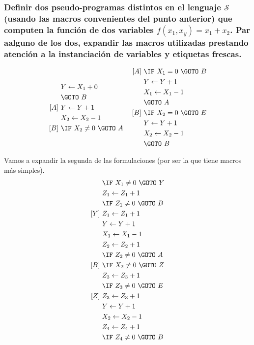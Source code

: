 \documentclass[fleqn, 11pt]{article}
\newcommand{\Scur}{\mathcal{S}}
\newcommand{\into}{\leftarrow}
\begin{document}
\subsubsection{Definir dos pseudo-programas distintos en el lenguaje $\Scur$
(usando las macros convenientes del punto anterior) que computen la función de
dos variables $f(x_1, x_y) = x_1 + x_2$. Par aalguno de los dos, expandir las
macros utilizadas prestando atención a la instanciación de variables y
etiquetas frescas.}

\begin{align*}
	\begin{aligned}
		     &Y   \into X_1 + 0 \\
		     &\GOTO\ B \\
		[A]\ &Y   \into Y   + 1 \\
		     &X_2 \into X_2 - 1 \\
		[B]\ &\IF\ X_2 \neq 0\ \GOTO\ A
	\end{aligned}
	&&
	\begin{aligned}\
		[A]\ &\IF\ X_1 = 0\ \GOTO\ B \\
		     &Y   \into Y   + 1 \\
		     &X_1 \into X_1 - 1 \\
		     &\GOTO\ A \\
		[B]\ &\IF\ X_2 = 0\ \GOTO\ E \\
		     &Y   \into Y   + 1 \\
		     &X_2 \into X_2 - 1 \\
		     &\GOTO\ B
	\end{aligned}
\end{align*}

Vamos a expandir la segunda de las formulaciones (por ser la que tiene macros
más simples).
\begin{align*}
	[A]\ &\IF\ X_1 \neq 0\ \GOTO\ Y \\
	     &Z_1 \into Z_1 + 1 \\
	     &\IF\ Z_1 \neq 0\ \GOTO\ B \\
	[Y]\ &Z_1 \into Z_1 + 1 \\
	     &Y   \into Y   + 1 \\
	     &X_1 \into X_1 - 1 \\
	     &Z_2 \into Z_2 + 1 \\
	     &\IF\ Z_2 \neq 0\ \GOTO\ A \\
	[B]\ &\IF\ X_2 \neq 0\ \GOTO\ Z \\
	     &Z_3 \into Z_3 + 1 \\
	     &\IF\ Z_3 \neq 0\ \GOTO\ E \\
	[Z]\ &Z_3 \into Z_3 + 1 \\
	     &Y   \into Y   + 1 \\
	     &X_2 \into X_2 - 1 \\
	     &Z_4 \into Z_4 + 1 \\
	     &\IF\ Z_4 \neq 0\ \GOTO\ B \\
\end{align*}
\end{document}
